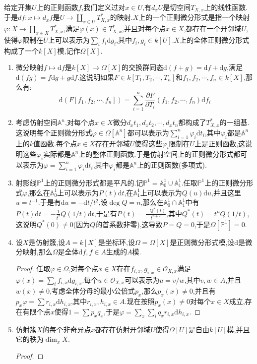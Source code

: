 给定开集$U$上的正则函数$f$,我们定义过对$x\in U$,有$d_xU$是切空间$T_{X,x}$上的线性函数.于是$df:x\mapsto d_xf$是$U\to\coprod_{x\in U}T_{X,x}^*$的映射.$X$上的一个正则微分形式是指一个映射$\varphi:X\to\coprod_{x\in X}T_{X,x}^*$,满足$\varphi(x)\in T_{X,x}^*$,并且对每个点$x\in X$,都存在一个开邻域$U$,使得$\varphi$限制在$U$上可以表示为$\sum_if_i\mathrm{d}g_i$,其中$f_i,g_i\in k[U]$.$X$上的全体正则微分形式构成了一个$k[X]$模,记作$\Omega[X]$.
\begin{enumerate}
	\item 微分映射$f\mapsto\mathrm{d}f$是$k[X]\to\Omega[X]$的交换群同态$\mathrm{d}(f+g)=\mathrm{d}f+\mathrm{d}g$,满足$\mathrm{d}(fg)=f\mathrm{d}g+g\mathrm{d}f$.这说明如果$F\in k[T_1,T_2,\cdots,T_n]$和$f_1,f_2,\cdots,f_n\in k[X]$,那么有:
	$$\mathrm{d}(F[f_1,f_2,\cdots,f_n])=\sum_{i=1}^n\frac{\partial F}{\partial T_i}(f_1,f_2,\cdots,f_n)\mathrm{d}f_i$$
	\item 考虑仿射空间$\mathbb{A}^n$,对每个点$x\in X$微分$d_xt_1,d_xt_2,\cdots,d_xt_n$都构成了$T_{X,x}^*$的一组基.这说明每个正则微分形式$\varphi\in\Omega[\mathbb{A}^n]$都可以表示为$\sum_{i=1}^n\varphi_i\mathrm{d}t_i$,其中$\varphi_i$都是$\mathbb{A}^n$上的$k$值函数.每个点$x\in X$存在开邻域$U$使得这些$\varphi_i$限制在$U$上是正则函数,这说明这些$\varphi_i$实际都是$\mathbb{A}^n$上的整体正则函数.于是仿射空间上的正则微分形式都可以表示为$\varphi=\sum_{i=1}^n\varphi_i\mathrm{d}t_i$,其中$\varphi_i$都是$\mathbb{A}^n$上的正则函数(多项式).
	\item 射影线$\mathbb{P}^1$上的正则微分形式都是平凡的.记$\mathbb{P}^1=\mathbb{A}_0^1\cup\mathbb{A}_1^1$.任取$\mathbb{P}^1$上的正则微分形式$\varphi$,那么在$\mathbb{A}_0^1$上可以表示为$P(t)\mathrm{d}t$,在$\mathbb{A}_1^1$上可以表示为$Q(u)\mathrm{d}u$,并且这里$u=t^{-1}$.于是有$\mathrm{d}u=-\mathrm{d}t/t^2$,设$\deg Q=n$,那么在$\mathbb{A}_0^1\cap\mathbb{A}_1^1$中有$P(t)\mathrm{d}t=-\frac{1}{t^2}Q(1/t)\mathrm{d}t$,于是有$P(t)=\frac{-Q^*(t)}{t^{n+2}}$,其中$Q^*(t)=t^nQ(1/t)$,这说明$Q^*(0)\not=0$(因为$Q$的首系数非零),这导致$P=Q=0$,于是$\Omega[\mathbb{P}^1]=0$.
	\item 设$X$是仿射簇,设$A=k[X]$是坐标环,设$\Omega=\Omega[X]$是正则微分形式模,设$\mathrm{d}$是微分映射,那么$\Omega$是全体$\mathrm{d}f,f\in A$生成的$A$模.
	\begin{proof}
		
		任取$\varphi\in\Omega$,对每个点$x\in X$存在$f_{i,x},g_{i,x}\in\mathscr{O}_{X,x}$满足$\varphi(x)=\sum_if_{i,x}\mathrm{d}g_{i,x}$.每个$u\in\mathscr{O}_{X,x}$可以表示为$u=v/w$,其中$v,w\in A$,并且$w(x)\not=0$,考虑全体分母的最小公倍式$p_x$,那么$p_x(x)\not=0$,并且有$p_x\varphi=\sum r_{i,x}\mathrm{d}h_{i,x}$,其中$r_{i,x},h_{i,x}\in A$.现在按照$p_x(x)\not=0$对每个$x\in X$成立,存在有限个点$x$使得$1=\sum p_xq_x$,于是$\varphi=\sum_x\sum_i q_xr_{i,x}\mathrm{d}h_{i,x}$.
	\end{proof}
    \item 仿射簇$X$的每个非奇异点$x$都存在仿射开邻域$U$使得$\Omega[U]$是自由$k[U]$模,并且它的秩为$\dim_xX$.
    \begin{proof}
    	

\end{proof}
\end{enumerate}
